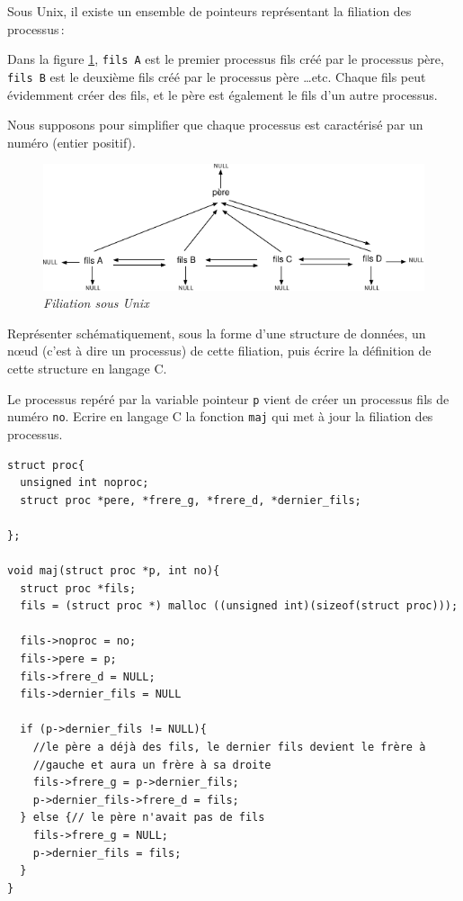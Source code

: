 \documentclass[10pt]{article}\usepackage[nu,correction]{esial}
\begin{document}
\bigskip\bigskip{}

Sous Unix, il existe un ensemble de pointeurs représentant la
filiation des  processus\,: 

Dans la figure \ref{filiation}, {\tt fils A} est le premier processus
fils créé par le processus père, {\tt fils B} est le deuxième fils
créé par le processus père \ldots etc.
Chaque fils peut évidemment créer des fils, et le père est également le
fils d'un autre processus.

Nous supposons pour simplifier que chaque processus est caractérisé
par un numéro (entier positif).


\bigskip\bigskip
\begin{figure}[h]
  \centerline{\includegraphics[width=\linewidth]{filiation.pdf}}
  \caption[]
	  {{\it Filiation sous Unix}}
	  \label{filiation}
\end{figure}
\bigskip

\Question  Représenter schématiquement, sous la
forme d'une structure de données, un n\oe ud (c'est à dire un
processus) de cette filiation, puis écrire la définition de cette
structure en langage C.

\Question  Le processus repéré par la variable
pointeur {\tt p} vient de créer un processus fils de numéro {\tt no}.
Ecrire en langage C la fonction {\tt maj} qui met à jour la filiation
des processus.

\begin{Reponse}
\vspace{-.7cm}
\begin{verbatim}
struct proc{
  unsigned int noproc;
  struct proc *pere, *frere_g, *frere_d, *dernier_fils;
  
};

void maj(struct proc *p, int no){
  struct proc *fils;
  fils = (struct proc *) malloc ((unsigned int)(sizeof(struct proc)));

  fils->noproc = no;
  fils->pere = p;
  fils->frere_d = NULL;
  fils->dernier_fils = NULL 

  if (p->dernier_fils != NULL){
    //le père a déjà des fils, le dernier fils devient le frère à
    //gauche et aura un frère à sa droite
    fils->frere_g = p->dernier_fils;
    p->dernier_fils->frere_d = fils;
  } else {// le père n'avait pas de fils
    fils->frere_g = NULL;
    p->dernier_fils = fils;
  } 
}
\end{verbatim}
~
\end{Reponse}
\end{document}
